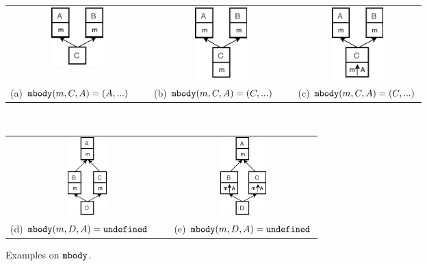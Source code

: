 \begin{figure}[t]
	\centering
	\vspace{-1ex}
	\begin{tabular}{ccc}
		\includegraphics[width=2cm]{pics/p1.pdf}\hspace{4pt} &
		\includegraphics[width=2cm]{pics/p2.pdf}\hspace{4pt} &
		\includegraphics[width=2cm]{pics/p3.pdf}\hspace{4pt} \\
		(a) $\texttt{mbody}(m,C,A) = (A,...)$\ \ \  & (b) $\texttt{mbody}(m,C,A) = (C,...)$\ \ \  & (c) $\texttt{mbody}(m,C,A) = (C,...)$
	\end{tabular} \\
   \begin{tabular}{cc}
   	\includegraphics[height=3cm]{pics/p4.pdf}\hspace{4pt} &
   	\includegraphics[height=3cm]{pics/p5.pdf}\hspace{4pt} \\ 
   	(d) $\texttt{mbody}(m,D,A) = \texttt{undefined}$\ \ \  & (e) $\texttt{mbody}(m,D,A) = \texttt{undefined}$
   \end{tabular}
	\caption{Examples on $\texttt{mbody}$.}\label{fig:examplesmbody}
\end{figure}

